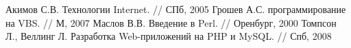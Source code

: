 \begin{thebibliography}{30}
 Акимов С.В. Технологии Internet. // СПб, 2005
 Грошев А.С. программирование на VBS. // М, 2007
 Маслов В.В. Введение в Perl. // Оренбург, 2000
 Томпсон Л., Веллинг Л. Разработка Web-приложений на PHP и MySQL. // Спб, 2008
% 
% 
% 
\end{thebibliography}
% 
